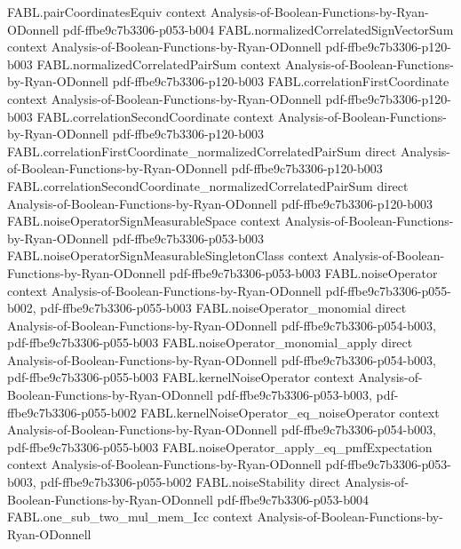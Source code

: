 \begin{theorem}
  {FABL.pairCoordinatesEquiv}
  {context}
  {Analysis-of-Boolean-Functions-by-Ryan-ODonnell}
  {pdf-ffbe9c7b3306-p053-b004}
\proofstep
  {FABL.normalizedCorrelatedSignVectorSum}
  {context}
  {Analysis-of-Boolean-Functions-by-Ryan-ODonnell}
  {pdf-ffbe9c7b3306-p120-b003}
\proofstep
  {FABL.normalizedCorrelatedPairSum}
  {context}
  {Analysis-of-Boolean-Functions-by-Ryan-ODonnell}
  {pdf-ffbe9c7b3306-p120-b003}
\proofstep
  {FABL.correlationFirstCoordinate}
  {context}
  {Analysis-of-Boolean-Functions-by-Ryan-ODonnell}
  {pdf-ffbe9c7b3306-p120-b003}
\proofstep
  {FABL.correlationSecondCoordinate}
  {context}
  {Analysis-of-Boolean-Functions-by-Ryan-ODonnell}
  {pdf-ffbe9c7b3306-p120-b003}
\proofstep
  {FABL.correlationFirstCoordinate_normalizedCorrelatedPairSum}
  {direct}
  {Analysis-of-Boolean-Functions-by-Ryan-ODonnell}
  {pdf-ffbe9c7b3306-p120-b003}
\proofstep
  {FABL.correlationSecondCoordinate_normalizedCorrelatedPairSum}
  {direct}
  {Analysis-of-Boolean-Functions-by-Ryan-ODonnell}
  {pdf-ffbe9c7b3306-p120-b003}
\proofstep
  {FABL.noiseOperatorSignMeasurableSpace}
  {context}
  {Analysis-of-Boolean-Functions-by-Ryan-ODonnell}
  {pdf-ffbe9c7b3306-p053-b003}
\proofstep
  {FABL.noiseOperatorSignMeasurableSingletonClass}
  {context}
  {Analysis-of-Boolean-Functions-by-Ryan-ODonnell}
  {pdf-ffbe9c7b3306-p053-b003}
\proofstep
  {FABL.noiseOperator}
  {context}
  {Analysis-of-Boolean-Functions-by-Ryan-ODonnell}
  {pdf-ffbe9c7b3306-p055-b002,
    pdf-ffbe9c7b3306-p055-b003}
\proofstep
  {FABL.noiseOperator_monomial}
  {direct}
  {Analysis-of-Boolean-Functions-by-Ryan-ODonnell}
  {pdf-ffbe9c7b3306-p054-b003,
    pdf-ffbe9c7b3306-p055-b003}
\proofstep
  {FABL.noiseOperator_monomial_apply}
  {direct}
  {Analysis-of-Boolean-Functions-by-Ryan-ODonnell}
  {pdf-ffbe9c7b3306-p054-b003,
    pdf-ffbe9c7b3306-p055-b003}
\proofstep
  {FABL.kernelNoiseOperator}
  {context}
  {Analysis-of-Boolean-Functions-by-Ryan-ODonnell}
  {pdf-ffbe9c7b3306-p053-b003,
    pdf-ffbe9c7b3306-p055-b002}
\proofstep
  {FABL.kernelNoiseOperator_eq_noiseOperator}
  {context}
  {Analysis-of-Boolean-Functions-by-Ryan-ODonnell}
  {pdf-ffbe9c7b3306-p054-b003,
    pdf-ffbe9c7b3306-p055-b003}
\proofstep
  {FABL.noiseOperator_apply_eq_pmfExpectation}
  {context}
  {Analysis-of-Boolean-Functions-by-Ryan-ODonnell}
  {pdf-ffbe9c7b3306-p053-b003,
    pdf-ffbe9c7b3306-p055-b002}
\proofstep
  {FABL.noiseStability}
  {direct}
  {Analysis-of-Boolean-Functions-by-Ryan-ODonnell}
  {pdf-ffbe9c7b3306-p053-b004}
\proofstep
  {FABL.one_sub_two_mul_mem_Icc}
  {context}
  {Analysis-of-Boolean-Functions-by-Ryan-ODonnell}

\end{theorem}
